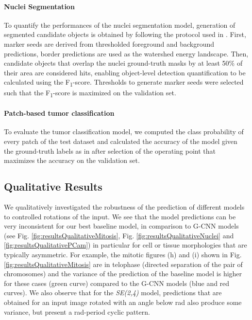 \documentclass[twocolumn,final]{article}
\newcommand{\fscore}[1]{F\textsubscript{#1}-score}
\newcommand{\se}[1]{\textit{SE(#1)}}
\begin{document}
\paragraph{Nuclei Segmentation}
To quantify the performances of the nuclei segmentation model, generation of segmented candidate objects is obtained by following the protocol used in \citep{kumar2017dataset, lafarge2019domain}.
First, marker seeds are derived from thresholded foreground and background predictions, border predictions are used as the watershed energy landscape.
Then, candidate objects that overlap the nuclei ground-truth masks by at least 50\% of their area are considered hits, enabling object-level detection quantification to be calculated using the \fscore{1}.
Thresholds to generate marker seeds were selected such that the \fscore{1} is maximized on the validation set.

\paragraph{Patch-based tumor classification}
To evaluate the tumor classification model, we computed the class probability of every patch of the test dataset and calculated the accuracy of the model given the ground-truth labels as in \citet{veeling2018rotation} after selection of the operating point that maximizes the accuracy on the validation set.


\subsection{Qualitative Results}
\label{qualitativeResults}
We qualitatively investigated the robustness of the prediction of different models to controlled rotations of the input.
We see that the model predictions can be very inconsistent for our best baseline model, in comparison to G-CNN models (see Fig. \ref{fig:resultsQualitativeMitosis}, Fig. \ref{fig:resultsQualitativeNuclei} and \ref{fig:resultsQualitativePCam}) in particular for cell or tissue morphologies that are typically asymmetric.
For example, the mitotic figures (h) and (i) shown in Fig. \ref{fig:resultsQualitativeMitosis} are in telophase (directed separation of the pair of chromosomes) and the variance of the prediction of the baseline model is higher for these cases (green curve) compared to the G-CNN models (blue and red curves).
We also observe that for the \se{2,4} model, predictions that are obtained for an input image rotated with an angle below rad also produce some variance, but present a rad-period cyclic pattern.
\end{document}

